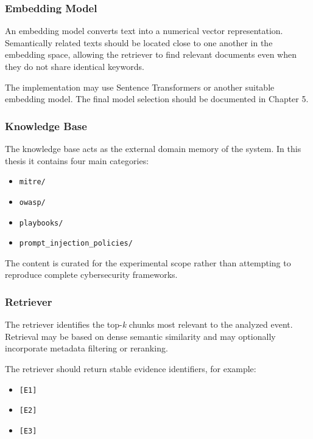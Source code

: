 \subsubsection{Embedding Model}\label{embedding-model}

An embedding model converts text into a numerical vector representation.
Semantically related texts should be located close to one another in the
embedding space, allowing the retriever to find relevant documents even
when they do not share identical keywords.

The implementation may use Sentence Transformers or another suitable
embedding model. The final model selection should be documented in
Chapter 5.

\subsubsection{Knowledge Base}\label{knowledge-base}

The knowledge base acts as the external domain memory of the system. In
this thesis it contains four main categories:

\begin{itemize}
\item \texttt{mitre/}
\item \texttt{owasp/}
\item \texttt{playbooks/}
\item \texttt{prompt\_injection\_policies/}
\end{itemize}

The content is curated for the experimental scope rather than attempting
to reproduce complete cybersecurity frameworks.

\subsubsection{Retriever}\label{retriever}

The retriever identifies the top-\emph{k} chunks most relevant to the
analyzed event. Retrieval may be based on dense semantic similarity and
may optionally incorporate metadata filtering or reranking.

The retriever should return stable evidence identifiers, for example:

\begin{itemize}
\item \texttt{[E1]}
\item \texttt{[E2]}
\item \texttt{[E3]}
\end{itemize}

